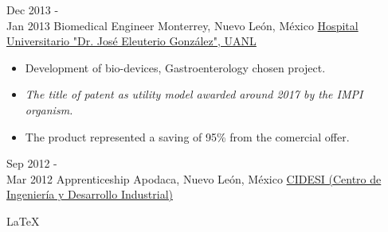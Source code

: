 \documentclass[a4paper]{twentysecondcv} %
\begin{document}
\begin{twenty}
     \twentyitem
        {Dec 2013 - \\ Jan 2013}
        {Biomedical Engineer }
        {Monterrey, Nuevo Le\'on, M\'exico}
        {\href{http://www.medicina.uanl.mx/servicios-y-departamentos/servicios-clinicos/gastroenterologia/}{Hospital Universitario "Dr. Jos\'e Eleuterio Gonz\'alez", UANL}}
        {
        \begin{itemize}
        \item Development of bio-devices, Gastroenterology chosen project.    
        \item
        \textit{The title of patent as utility model awarded around 2017 by the IMPI organism.}
        \item The product represented a saving of 95\% from the comercial offer.
        \end{itemize}
    	}
        
	\twentyitem
		{Sep 2012 - \\ Mar 2012}
		{Apprenticeship}
		{Apodaca, Nuevo Le\'on,  M\'exico}
		{\href{http://www.cidesi.com/}{CIDESI (Centro de Ingeniería y Desarrollo Industrial)}}
		
	
	
	
\end{twenty}
\begin{center}
\LaTeX
\end{center}
\end{document}
